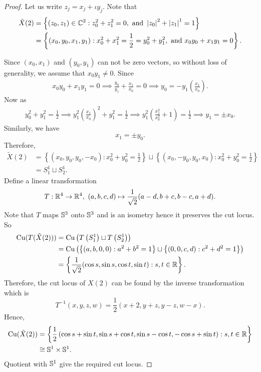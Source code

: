 \begin{proof}
	Let us write $z_j=x_j+\iota y_j$. Note that 
	\begin{align*}
		 \tilde{X}(2) & = \left\{\left(z_0,z_1\right)\in \mathbb{C}^{2}:z_0^2+z_1^2=0,\text{ and } \left|z_0\right|^2+\left|z_1\right|^1=1 \right\} \\
		 & = \left\{\left(x_0,y_0,x_1,y_1\right):x_0^2+x_1^2=\frac{1}{2}=y_0^2+y_1^2,\text{ and } x_0y_0+x_1y_1=0\right\}.
	\end{align*}

	\noindent Since $\left(x_0,x_1\right)$ and $\left(y_0,y_1\right)$ can not be zero vectors, so without loss of generality, we assume that $x_0y_1\neq 0$. Since 
	\begin{align*}
		x_0y_0+x_1y_1=0 \implies \frac{y_0}{y_1}+\frac{x_1}{x_0} = 0 \implies y_0 = -y_1 \left(\frac{x_1}{x_0}\right).
	\end{align*} 
	Now as 
	\begin{align*}
		y_0^2+y_1^2=\frac{1}{2} \implies y_1^2 \left(\frac{x_1}{x_0}\right)^2+y_1^2=\frac{1}{2} \implies y_1^2 \left(\frac{x_1^2}{x_0^2}+1\right) = \frac{1}{2} \implies y_1=\pm x_0.
	\end{align*}
	Similarly, we have 
	\begin{displaymath}
		x_1=\pm y_0.
	\end{displaymath}
	Therefore, 
	\begin{align*}
		\tilde{X}(2) & = \left\{\left(x_0,y_0,y_0,-x_0\right):x_0^2+y_0^2=\frac{1}{2}\right\}\sqcup \left\{\left(x_0,-y_0,y_0,x_0\right):x_0^2+y_0^2=\frac{1}{2}\right\} \\
        & = S^1_1\sqcup S^1_2.
	\end{align*}
	Define a linear transformation 
	\begin{displaymath}
		T:\mathbb{R}^4\to \mathbb{R}^4, ~(a,b,c,d) \mapsto \frac{1}{\sqrt{2}}(a-d,b+c,b-c,a+d).
	\end{displaymath}
	Note that $T$ maps $\mathbb{S}^3$ onto $\mathbb{S}^3$ and is an isometry hence it preserves the cut locus. So 
	\begin{align*}
		\mathrm{Cu}(T(\tilde{X}(2))) & = \mathrm{Cu} \left(T \left(S^1_1\right)\sqcup T \left(S^1_2\right)\right) \\ 
		& = \mathrm{Cu} \left(\left\{(a,b,0,0):a^2+b^2=1\right\} \sqcup \left\{(0,0,c,d):c^2+d^2=1\right\}\right) \\
		& = \left\{\frac{1}{\sqrt{2}}(\cos s,\sin s, \cos t,\sin t):s,t\in\mathbb{R} \right\}.
	\end{align*}
	Therefore, the cut locus of $X(2)$ can be found by the inverse transformation which is 
	\begin{displaymath}
		 T^{-1}(x,y,z,w) = \frac{1}{2} (x+2,y+z,y-z,w-x).
	\end{displaymath}
	Hence, 
	\begin{align*}
		\mathrm{Cu} (\tilde{X}(2)) & = \left\{\frac{1}{2} \left(\cos s+\sin t, \sin s+\cos t,\sin s-\cos t,-\cos s+\sin t\right):s,t\in \mathbb{R}\right\}\\ & \cong \mathbb{S}^1\times \mathbb{S}^1.
	\end{align*}
	Quotient with $\mathbb{S}^1$ give the required cut locus.
\end{proof}


